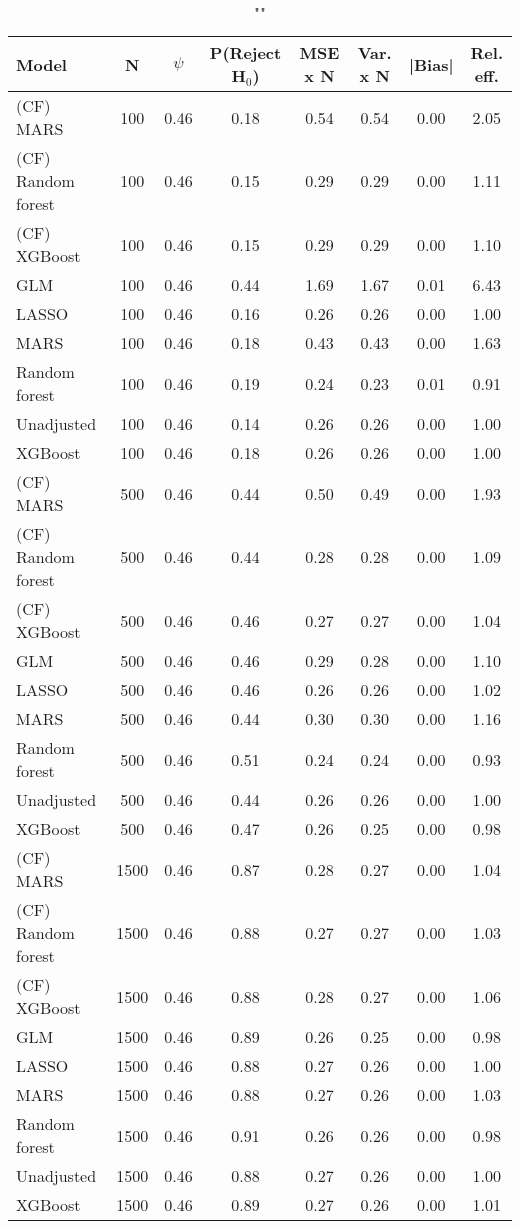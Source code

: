 \begin{table}
\centering
\caption{""}
\begin{tabular}{lccccccc}
\toprule
Model & N & $\psi$ & P(Reject H$_0$) & MSE x N & Var. x N & |Bias| & Rel. eff.\\ \midrule
(CF) MARS & 100 & 0.46 & 0.18 & 0.54 & 0.54 & 0.00 & 2.05 \\ 
(CF) Random forest & 100 & 0.46 & 0.15 & 0.29 & 0.29 & 0.00 & 1.11 \\ 
(CF) XGBoost & 100 & 0.46 & 0.15 & 0.29 & 0.29 & 0.00 & 1.10 \\ 
GLM & 100 & 0.46 & 0.44 & 1.69 & 1.67 & 0.01 & 6.43 \\ 
LASSO & 100 & 0.46 & 0.16 & 0.26 & 0.26 & 0.00 & 1.00 \\ 
MARS & 100 & 0.46 & 0.18 & 0.43 & 0.43 & 0.00 & 1.63 \\ 
Random forest & 100 & 0.46 & 0.19 & 0.24 & 0.23 & 0.01 & 0.91 \\ 
Unadjusted & 100 & 0.46 & 0.14 & 0.26 & 0.26 & 0.00 & 1.00 \\ 
XGBoost & 100 & 0.46 & 0.18 & 0.26 & 0.26 & 0.00 & 1.00 \\ \addlinespace 
(CF) MARS & 500 & 0.46 & 0.44 & 0.50 & 0.49 & 0.00 & 1.93 \\ 
(CF) Random forest & 500 & 0.46 & 0.44 & 0.28 & 0.28 & 0.00 & 1.09 \\ 
(CF) XGBoost & 500 & 0.46 & 0.46 & 0.27 & 0.27 & 0.00 & 1.04 \\ 
GLM & 500 & 0.46 & 0.46 & 0.29 & 0.28 & 0.00 & 1.10 \\ 
LASSO & 500 & 0.46 & 0.46 & 0.26 & 0.26 & 0.00 & 1.02 \\ 
MARS & 500 & 0.46 & 0.44 & 0.30 & 0.30 & 0.00 & 1.16 \\ 
Random forest & 500 & 0.46 & 0.51 & 0.24 & 0.24 & 0.00 & 0.93 \\ 
Unadjusted & 500 & 0.46 & 0.44 & 0.26 & 0.26 & 0.00 & 1.00 \\ 
XGBoost & 500 & 0.46 & 0.47 & 0.26 & 0.25 & 0.00 & 0.98 \\ \addlinespace 
(CF) MARS & 1500 & 0.46 & 0.87 & 0.28 & 0.27 & 0.00 & 1.04 \\ 
(CF) Random forest & 1500 & 0.46 & 0.88 & 0.27 & 0.27 & 0.00 & 1.03 \\ 
(CF) XGBoost & 1500 & 0.46 & 0.88 & 0.28 & 0.27 & 0.00 & 1.06 \\ 
GLM & 1500 & 0.46 & 0.89 & 0.26 & 0.25 & 0.00 & 0.98 \\ 
LASSO & 1500 & 0.46 & 0.88 & 0.27 & 0.26 & 0.00 & 1.00 \\ 
MARS & 1500 & 0.46 & 0.88 & 0.27 & 0.26 & 0.00 & 1.03 \\ 
Random forest & 1500 & 0.46 & 0.91 & 0.26 & 0.26 & 0.00 & 0.98 \\ 
Unadjusted & 1500 & 0.46 & 0.88 & 0.27 & 0.26 & 0.00 & 1.00 \\ 
XGBoost & 1500 & 0.46 & 0.89 & 0.27 & 0.26 & 0.00 & 1.01 \\
\bottomrule
\end{tabular}
\end{table}
